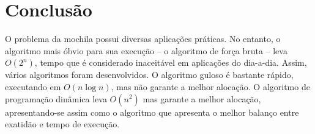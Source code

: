 \documentclass[a4paper,twocolumn]{article}
\begin{document}

\section{Conclusão}

O problema da mochila possui diversas aplicações práticas. No entanto, o algoritmo mais óbvio para sua execução -- o algoritmo de força bruta -- leva $O(2^n)$, tempo que é considerado inaceitável em aplicações do dia-a-dia. Assim, vários algoritmos foram desenvolvidos. O algoritmo guloso é bastante rápido, executando em $O(n\log n)$, mas não garante a melhor alocação. O algoritmo de programação dinâmica leva $O(n^2)$ mas garante a melhor alocação, apresentando-se assim como o algoritmo que apresenta o melhor balanço entre exatidão e tempo de execução.




\begin{small}
  
\end{small}
\end{document}
